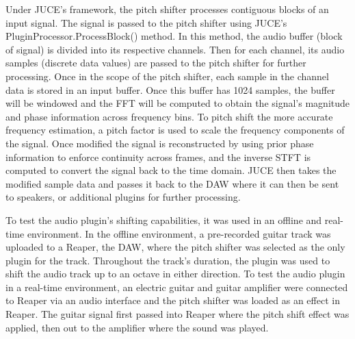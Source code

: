 \documentclass[12pt]{article}
\begin{document}
Under JUCE's framework, the pitch shifter processes contiguous blocks of an input signal. The signal is passed to the pitch shifter using JUCE's PluginProcessor.ProcessBlock() method. In this method, 
the audio buffer (block of signal) is divided into its respective channels. Then for each channel, its audio samples (discrete data values) are passed to the pitch shifter for further processing.
Once in the scope of the pitch shifter, each sample in the channel data is stored in an input buffer. Once this buffer has 1024 samples, the buffer will be windowed and the FFT will be computed to 
obtain the signal's magnitude and phase information across frequency bins. To pitch shift the more accurate frequency estimation, a pitch factor is used to scale the frequency components of the signal. 
Once modified the signal is reconstructed by using prior phase information to enforce continuity across frames, and the inverse STFT is computed to convert the signal back to the time domain. JUCE then takes 
the modified sample data and passes it back to the DAW where it can then be sent to speakers, or additional plugins for further processing. 

To test the audio plugin's shifting capabilities, it was used in an offline and real-time environment. In the offline environment, a pre-recorded guitar track
was uploaded to a Reaper, the DAW, where the pitch shifter was selected as the only plugin for the track. Throughout the track's duration, the plugin was used to
shift the audio track up to an octave in either direction. To test the audio plugin in a real-time environment, an electric guitar and guitar amplifier were connected to Reaper via an audio interface 
and the pitch shifter was loaded as an effect in Reaper. The guitar signal first passed into Reaper where the pitch shift effect was applied, then out to the amplifier where the sound was played.  

\end{document}
